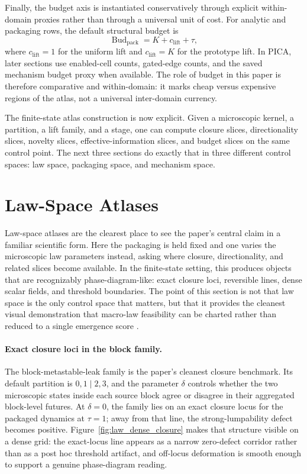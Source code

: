 \documentclass[11pt]{article}
\theoremstyle{definition}
\begin{document}
Finally, the budget axis is instantiated conservatively through explicit within-domain proxies rather than through a universal unit of cost. For analytic and packaging rows, the default structural budget is
\begin{equation}\label{eq:analytic_budget_proxy}
\operatorname{Bud}_{\mathrm{pack}}
=
K + c_{\mathrm{lift}} + \tau,
\end{equation}
where $c_{\mathrm{lift}}=1$ for the uniform lift and $c_{\mathrm{lift}}=K$ for the prototype lift. In PICA, later sections use enabled-cell counts, gated-edge counts, and the saved mechanism budget proxy when available. The role of budget in this paper is therefore comparative and within-domain: it marks cheap versus expensive regions of the atlas, not a universal inter-domain currency.

The finite-state atlas construction is now explicit. Given a microscopic kernel, a partition, a lift family, and a stage, one can compute closure slices, directionality slices, novelty slices, effective-information slices, and budget slices on the same control point. The next three sections do exactly that in three different control spaces: law space, packaging space, and mechanism space.
 \section{Law-Space Atlases}\label{sec:law_space}

Law-space atlases are the clearest place to see the paper's central claim in a familiar scientific form. Here the packaging is held fixed and one varies the microscopic law parameters instead, asking where closure, directionality, and related slices become available. In the finite-state setting, this produces objects that are recognizably phase-diagram-like: exact closure loci, reversible lines, dense scalar fields, and threshold boundaries. The point of this section is not that law space is the only control space that matters, but that it provides the cleanest visual demonstration that macro-law feasibility can be charted rather than reduced to a single emergence score \cite{tsiokos2026_foundations,tsiokos2026_lay}.

\paragraph{Exact closure loci in the block family.}
The block-metastable-leak family is the paper's cleanest closure benchmark. Its default partition is $0,1\mid 2,3$, and the parameter $\delta$ controls whether the two microscopic states inside each source block agree or disagree in their aggregated block-level futures. At $\delta=0$, the family lies on an exact closure locus for the packaged dynamics at $\tau=1$; away from that line, the strong-lumpability defect becomes positive. Figure~\ref{fig:law_dense_closure} makes that structure visible on a dense grid: the exact-locus line appears as a narrow zero-defect corridor rather than as a post hoc threshold artifact, and off-locus deformation is smooth enough to support a genuine phase-diagram reading.
\end{document}
